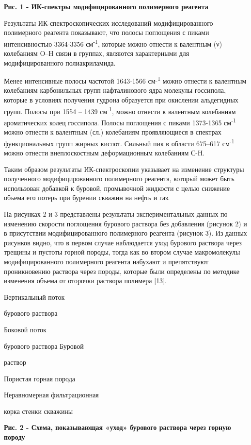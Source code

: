 {\bfseries Рис. 1 - ИК-спектры модифицированного полимерного реагента}

Результаты ИК-спектроскопических исследований модифицированного
полимерного реагента показывают, что полосы поглощения с пиками
интенсивностью 3364-3356 см\textsuperscript{-1}, которые можно отнести к
валентным (ν) колебаниям O--Н связи в группах, являются характерными для
модифицированного полиакриламида.

Менее интенсивные полосы частотой 1643-1566 см-\textsuperscript{1} можно
отнести к валентным колебаниям карбонильных групп нафталинового ядра
молекулы госсипола, которые в условиях получения гудрона образуется при
окислении альдегидных групп. Полосы при 1554 -- 1439
см\textsuperscript{-1}, можно отнести к валентным колебаниям
ароматических колец госсипола. Полосы поглощения с пиками 1373-1365
см\textsuperscript{-1} можно отнести к валентным (сл.) колебаниям
проявляющиеся в спектрах функциональных групп жирных кислот. Сильный пик
в области 675--617 см\textsuperscript{-1} можно отнести внеплоскостным
деформационным колебаниям С-Н.

Таким образом результаты ИК-спектроскопии указывает на изменение
структуры полученного модифицированного полимерного реагента, который
может быть использован добавкой к буровой, промывочной жидкости с целью
снижение объема его потерь при бурении скважин на нефть и газ.

На рисунках 2 и 3 представлены результаты экспериментальных данных по
изменению скорости поглощения бурового раствора без добавления (рисунок
2) и в присутствии модифицированного полимерного реагента (рисунок 3).
Из данных рисунков видно, что в первом случае наблюдается уход бурового
раствора через трещины и пустоты горной породы, тогда как во втором
случае макромолекулы модифицированного полимерного реагента набухают и
препятствуют проникновению раствора через породы, которые были
определены по методике изменения объема от оторочки раствора полимера
{[}13{]}.~

Вертикальный поток

бурового раствора

Боковой поток

бурового раствора Буровой

раствор

Пористая горная порода

Неравномерная фильтрационная

корка стенки скважины

{\bfseries Рис. 2 - Схема, показывающая «уход» бурового раствора через
горную породу}

